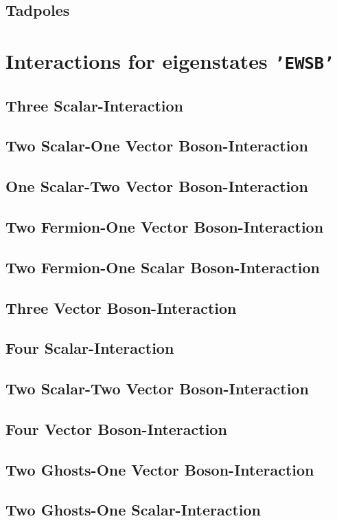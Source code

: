 \documentclass[A4]{article}
\begin{document}
\subsection{Tadpoles}
 
\section{Interactions for eigenstates {\tt 'EWSB'}}
\subsection{Three Scalar-Interaction}

\subsection{Two Scalar-One Vector Boson-Interaction}

\subsection{One Scalar-Two Vector Boson-Interaction}

\subsection{Two Fermion-One Vector Boson-Interaction}

\subsection{Two Fermion-One Scalar Boson-Interaction}

\subsection{Three Vector Boson-Interaction}

\subsection{Four Scalar-Interaction}

\subsection{Two Scalar-Two Vector Boson-Interaction}

\subsection{Four Vector Boson-Interaction}

\subsection{Two Ghosts-One Vector Boson-Interaction}

\subsection{Two Ghosts-One Scalar-Interaction}


\end{document}
